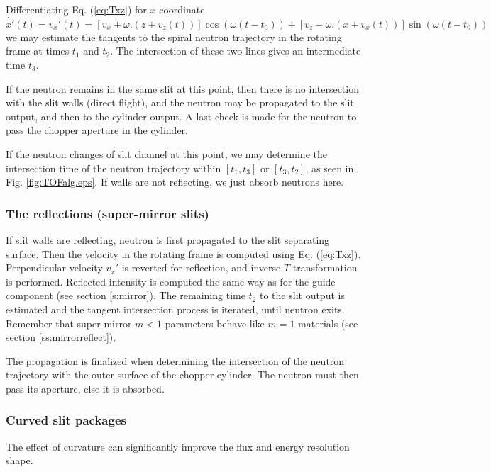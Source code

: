 Differentiating Eq. (\ref{eq:Txz}) for $x$ coordinate
\begin{equation}
\dot{x'}(t) = v_x'(t) = [v_x+\omega.(z+v_z(t))]\cos(\omega(t-t_0))
+ [v_z-\omega.(x+v_x(t))]\sin(\omega(t-t_0))
\end{equation}
we may estimate the tangents to the spiral neutron trajectory in the rotating frame at times $t_1$ and $t_2$. The intersection of these two lines gives an intermediate time $t_3$.

If the neutron remains in the same slit at this point, then there is no intersection with the slit walls (direct flight), and the neutron may be propagated to the slit output, and then to the cylinder output. A last check is made for the neutron to pass the chopper aperture in the cylinder.

If the neutron changes of slit channel at this point, we may determine the intersection time of the neutron trajectory within $[ t_1, t_3 ]$ or $[ t_3, t_2 ]$, as seen in Fig. \ref{fig:TOFalg.eps}. If walls are not reflecting, we just absorb neutrons here.

\subsubsection{The reflections (super-mirror slits)}

If slit walls are reflecting, neutron is first propagated to the slit separating surface. Then the velocity in the rotating frame is computed using Eq. (\ref{eq:Txz}). Perpendicular velocity $v_x'$ is reverted for reflection, and inverse $T$ transformation is performed. Reflected intensity is computed the same way as for the guide component (see section \ref{s:mirror}). The remaining time $t_2$ to the slit output is estimated and the tangent intersection process is iterated, until neutron exits. Remember that super mirror $m < 1$ parameters behave like $m=1$ materials (see section \ref{ss:mirrorreflect}).

The propagation is finalized when determining the intersection of the neutron trajectory with the outer surface of the chopper cylinder. The neutron must then pass its aperture, else it is absorbed.

\subsubsection{Curved slit packages}

The effect of curvature can significantly improve the flux and energy resolution shape.

